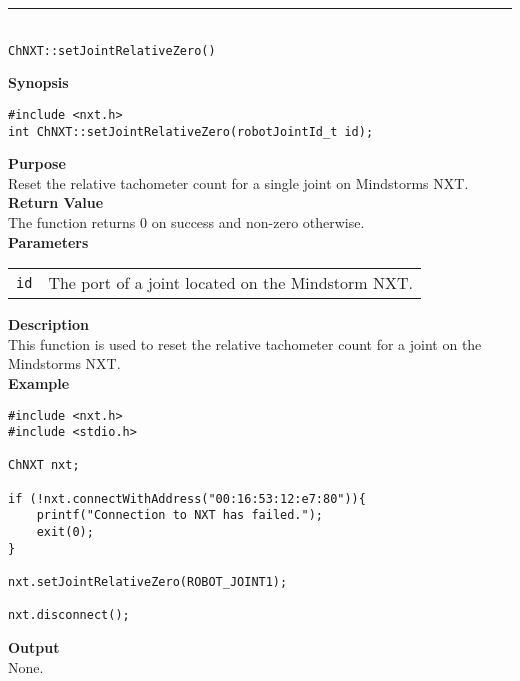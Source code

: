 \noindent
\vspace{5pt}
\rule{4.5in}{0.015in}\\
\noindent
{\LARGE \texttt{ChNXT::setJointRelativeZero()} }\\


\noindent
{\bf Synopsis}
\vspace{-8pt}
\begin{verbatim}
#include <nxt.h>
int ChNXT::setJointRelativeZero(robotJointId_t id);
\end{verbatim}

\noindent
{\bf Purpose}\\
Reset the relative tachometer count for a single joint on Mindstorms NXT.\\

\noindent
{\bf Return Value}\\
The function returns 0 on success and non-zero otherwise.\\

\noindent
{\bf Parameters}\\
\vspace{-0.1in}
\begin{description}
\item
\begin{tabular}{p{20mm}p{135mm}}
\texttt{id} &The port of a joint located on the Mindstorm NXT.\\
\end{tabular}
\end{description}

\noindent
{\bf Description}\\
This function is used to reset the relative tachometer count for a joint on the Mindstorms NXT.\\

\noindent
{\bf Example}
\begin{verbatim}
#include <nxt.h> 
#include <stdio.h>

ChNXT nxt;

if (!nxt.connectWithAddress("00:16:53:12:e7:80")){
    printf("Connection to NXT has failed.");
    exit(0);
}
    
nxt.setJointRelativeZero(ROBOT_JOINT1);

nxt.disconnect();
\end{verbatim}

\noindent
{\bf Output}\\
None.\\
\\
